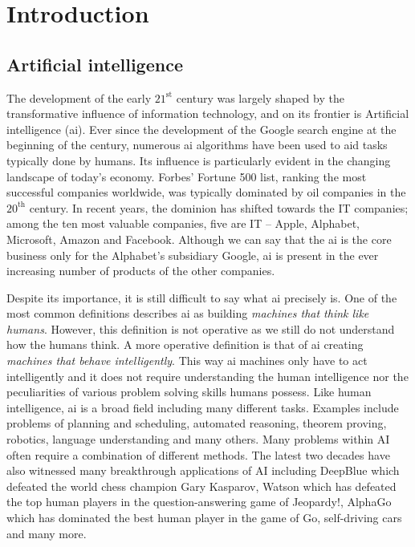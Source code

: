 \chapter{Introduction}\label{ch:introduction}


\section{Artificial intelligence}


The development of the early $21^{\text{st}}$ century was largely shaped by the transformative influence of information technology, and on its frontier is  Artificial intelligence (\gls{ai}).
Ever since the development of the Google search engine at the beginning of the century, numerous \gls{ai} algorithms have been used to aid tasks typically done by humans.
Its influence is particularly evident in the changing landscape of today's economy.
Forbes' Fortune 500 list, ranking the most successful companies worldwide, was typically dominated by oil companies in the $20^{\text{th}}$ century.
In recent years, the dominion has shifted towards the IT companies; among the ten most valuable companies, five are IT -- Apple, Alphabet, Microsoft, Amazon and Facebook.
Although we can say that the \gls{ai} is the core business only for the Alphabet's subsidiary Google, \gls{ai} is present in the ever increasing number of products of the other companies.







Despite its importance, it is still difficult to say what \gls{ai} precisely is.
One of the most common definitions describes \gls{ai} as building \textit{machines that think like humans}.
However, this definition is not operative as we still do not understand how the humans think.
A more operative definition is that of \gls{ai} creating \textit{machines that behave intelligently}.
This  way \gls{ai} machines only have to act intelligently and it does not require understanding the human intelligence nor the peculiarities of various problem solving skills humans possess.
Like human intelligence, \gls{ai} is a broad field including many different tasks.
Examples include problems of planning and scheduling, automated reasoning, theorem proving, robotics, language understanding and many others.
Many problems within AI often require a combination of different methods.
The latest two decades have also witnessed many breakthrough applications of AI including DeepBlue \cite{Hsu:2002:BDB:601291}  which defeated the world chess champion Gary Kasparov, Watson \cite{journals/aim/FerrucciBCFGKLMNPSW10} which has defeated the top human players in the question-answering game of Jeopardy!, AlphaGo \cite{SilverHuangEtAl16nature,silver2017mastering} which has dominated the best human player in the game of Go, self-driving cars and many more.





